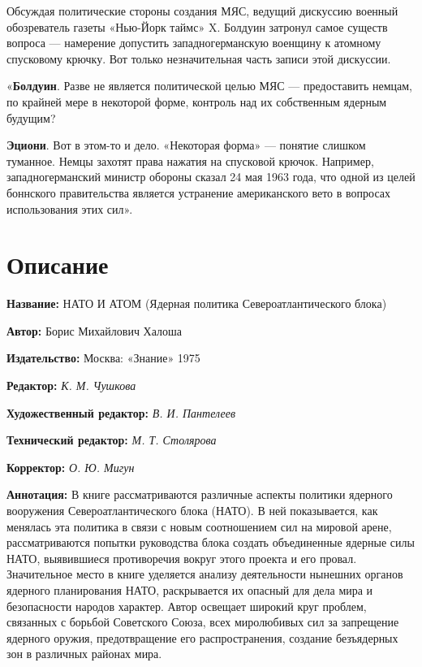 \documentclass[12pt, a4paper, openany]{book}
\begin{document}
	Обсуждая политические стороны создания МЯС, ведущий дискуссию военный обозреватель газеты «Нью-Йорк таймс» X. Болдуин затронул самое существ вопроса — намерение допустить западногерманскую военщину к атомному спусковому крючку. Вот только незначительная часть записи этой дискуссии.
	
	«\textbf{Болдуин}. Разве не является политической целью МЯС — предоставить немцам, по крайней мере в некоторой форме, контроль над их собственным ядерным будущим?

\textbf{Эциони}. Вот в этом-то и дело. «Некоторая форма» — понятие слишком туманное. Немцы захотят права нажатия на спусковой крючок. Например, западногерманский министр обороны сказал 24 мая 1963 года, что одной из целей боннского правительства является устранение американского вето в вопросах использования этих сил».
	
	\newpage
	\tableofcontents
	
	\thispagestyle{empty} %
	
	\newpage
	
	\setcounter{secnumdepth}{0}
	
	
		\section*{Описание}
	
	{\bf Название:} НАТО И АТОМ (Ядерная политика Североатлантического блока) 
	
{\bf Автор:} Борис Михайлович Халоша
	
{\bf Издательство:} Москва: «Знание» 1975
	
		{\bf Редактор:} \textit{К. М. Чушкова}
	
		{\bf Художественный редактор:} \textit{В. И. Пантелеев}
	
		{\bf Технический редактор:} \textit{М. Т. Столярова}
	
		{\bf Корректор:} \textit{О. Ю. Мигун}
	
		{\bf Аннотация:} В книге рассматриваются различные аспекты политики ядерного вооружения Североатлантического блока (НАТО). В ней показывается, как менялась эта политика в связи с новым соотношением сил на мировой арене, рассматриваются попытки руководства блока создать объединенные ядерные силы НАТО, выявившиеся противоречия вокруг этого проекта и его провал. Значительное место в книге уделяется анализу деятельности нынешних органов ядерного планирования НАТО, раскрывается их опасный для дела мира и безопасности народов характер. Автор освещает широкий круг проблем, связанных с борьбой Советского Союза, всех миролюбивых сил за запрещение ядерного оружия, предотвращение его распространения, создание безъядерных зон в различных районах мира. 
		\thispagestyle{empty} %

	
\end{document}
